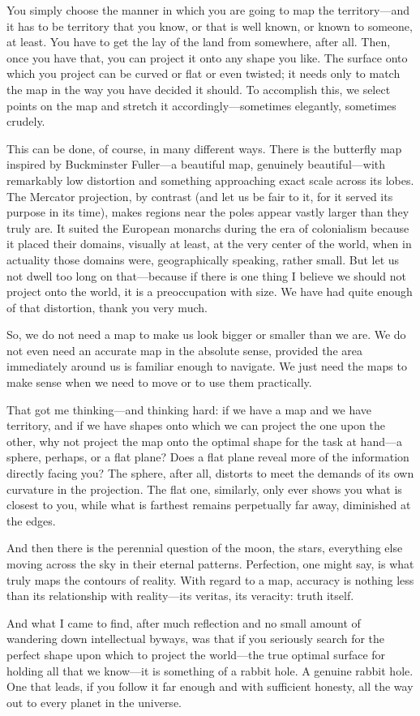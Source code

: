 \documentclass[11pt,oneside]{book}
\begin{document}
You simply choose the manner in which you are going to map the territory—and it has to be territory that you know, or that is well known, or known to someone, at least. You have to get the lay of the land from somewhere, after all. Then, once you have that, you can project it onto any shape you like. The surface onto which you project can be curved or flat or even twisted; it needs only to match the map in the way you have decided it should. To accomplish this, we select points on the map and stretch it accordingly—sometimes elegantly, sometimes crudely.

This can be done, of course, in many different ways. There is the butterfly map inspired by Buckminster Fuller—a beautiful map, genuinely beautiful—with remarkably low distortion and something approaching exact scale across its lobes. The Mercator projection, by contrast (and let us be fair to it, for it served its purpose in its time), makes regions near the poles appear vastly larger than they truly are. It suited the European monarchs during the era of colonialism because it placed their domains, visually at least, at the very center of the world, when in actuality those domains were, geographically speaking, rather small. But let us not dwell too long on that—because if there is one thing I believe we should not project onto the world, it is a preoccupation with size. We have had quite enough of that distortion, thank you very much.

So, we do not need a map to make us look bigger or smaller than we are. We do not even need an accurate map in the absolute sense, provided the area immediately around us is familiar enough to navigate. We just need the maps to make sense when we need to move or to use them practically.

That got me thinking—and thinking hard: if we have a map and we have territory, and if we have shapes onto which we can project the one upon the other, why not project the map onto the optimal shape for the task at hand—a sphere, perhaps, or a flat plane? Does a flat plane reveal more of the information directly facing you? The sphere, after all, distorts to meet the demands of its own curvature in the projection. The flat one, similarly, only ever shows you what is closest to you, while what is farthest remains perpetually far away, diminished at the edges.

And then there is the perennial question of the moon, the stars, everything else moving across the sky in their eternal patterns. Perfection, one might say, is what truly maps the contours of reality. With regard to a map, accuracy is nothing less than its relationship with reality—its veritas, its veracity: truth itself.

And what I came to find, after much reflection and no small amount of wandering down intellectual byways, was that if you seriously search for the perfect shape upon which to project the world—the true optimal surface for holding all that we know—it is something of a rabbit hole. A genuine rabbit hole. One that leads, if you follow it far enough and with sufficient honesty, all the way out to every planet in the universe.
\end{document}

